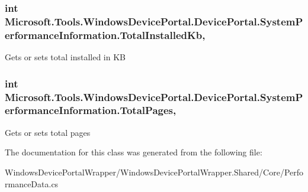 \subsubsection[{\texorpdfstring{Total\+Installed\+Kb}{TotalInstalledKb}}]{\setlength{\rightskip}{0pt plus 5cm}int Microsoft.\+Tools.\+Windows\+Device\+Portal.\+Device\+Portal.\+System\+Performance\+Information.\+Total\+Installed\+Kb\hspace{0.3cm}{\ttfamily [get]}, {\ttfamily [set]}}\hypertarget{class_microsoft_1_1_tools_1_1_windows_device_portal_1_1_device_portal_1_1_system_performance_information_ac6b885de8495da9bddd7135173f50263}{}\label{class_microsoft_1_1_tools_1_1_windows_device_portal_1_1_device_portal_1_1_system_performance_information_ac6b885de8495da9bddd7135173f50263}


Gets or sets total installed in KB 

\subsubsection[{\texorpdfstring{Total\+Pages}{TotalPages}}]{\setlength{\rightskip}{0pt plus 5cm}int Microsoft.\+Tools.\+Windows\+Device\+Portal.\+Device\+Portal.\+System\+Performance\+Information.\+Total\+Pages\hspace{0.3cm}{\ttfamily [get]}, {\ttfamily [set]}}\hypertarget{class_microsoft_1_1_tools_1_1_windows_device_portal_1_1_device_portal_1_1_system_performance_information_ac3627bdae82b51187923a8497a499e0a}{}\label{class_microsoft_1_1_tools_1_1_windows_device_portal_1_1_device_portal_1_1_system_performance_information_ac3627bdae82b51187923a8497a499e0a}


Gets or sets total pages 



The documentation for this class was generated from the following file\+:\begin{DoxyCompactItemize}
\item 
Windows\+Device\+Portal\+Wrapper/\+Windows\+Device\+Portal\+Wrapper.\+Shared/\+Core/Performance\+Data.\+cs\end{DoxyCompactItemize}
